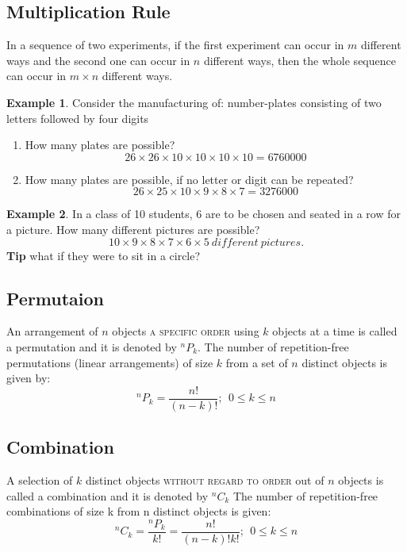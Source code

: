 \documentclass[12pt]{article}
\theoremstyle{definition}
\newtheorem{exmp}{Example}[section]
\newcommand*{\Perm}[2]{{}^{#1}\!P_{#2}}%
\newcommand*{\Comb}[2]{{}^{#1}C_{#2}}%
\begin{document}
\subsection{Multiplication Rule}
In a sequence of two experiments, if the
first experiment can occur in $m$ different
ways and the second one can occur in $n$
different ways, then the whole sequence
can occur in $m \times n$  different ways.
\begin{exmp}

    Consider the manufacturing of:
    number-plates consisting of two letters followed by four digits
    \begin{enumerate}
        \item  How many plates are possible?
            \[
                26 \times 26 \times 10 \times 10 \times 10 \times 10 = 6760000
            \]
        \item How many plates are possible, if no letter or digit can be repeated?
            \[
                26 \times 25 \times 10 \times 9 \times 8 \times 7 = 3276000 
            \]
    \end{enumerate}

\end{exmp}

\begin{exmp}
    In a class of 10 students, 6 are to be chosen and seated in a row for a
    picture.
    How many different pictures are possible?
    \[
        10 \times 9 \times 8 \times 7 \times 6 \times 5 \ different \  pictures.
    \]
    \textbf{Tip} what if they were to sit in a circle?
\end{exmp}

\subsection{Permutaion}
An arrangement of $n$ objects \textsc{ a specific order} using $k$ objects at a time is
called a permutation and it is denoted by $\Perm{n}{k}$. 
The number of repetition-free
permutations (linear arrangements) of size $k$ from a set of $n$ distinct objects
is given by:
\[
    \Perm{n}{k} = \frac{n!}{(n - k)!}; \ \ 0 \leq k \leq n
\]

\subsection{Combination}
A selection of $k$ distinct objects \textsc{without regard to order} out of $n$
objects is called a combination and it is denoted by $\Comb{n}{k} $
The number of repetition-free combinations of size k from n distinct objects is given:
\[
    \Comb{n}{k} = \frac{\Perm{n}{k}}{k!} = \frac{n!}{(n - k)!k!}; \ \  0 \leq k \leq n
\]
\end{document}
